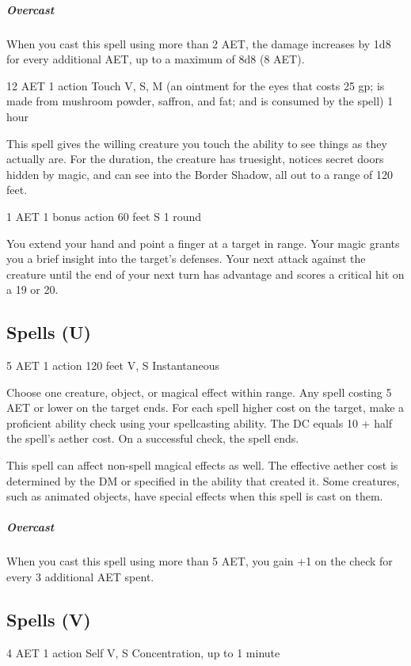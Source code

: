 \subparagraph*{Overcast} When you cast this spell using more than 2 AET, the damage increases by 1d8 for every additional AET, up to a maximum of 8d8 (8 AET).


{12 AET}
{1 action}
{Touch}
{V, S, M (an ointment for the eyes that costs 25 gp; is made from mushroom powder, saffron, and fat; and is consumed by the spell)}
{1 hour}

This spell gives the willing creature you touch the ability to see things as they actually are. For the duration, the creature has truesight, notices secret doors hidden by magic, and can see into the Border Shadow, all out to a range of 120 feet.


{1 AET}
{1 bonus action}
{60 feet}
{S}
{1 round}

You extend your hand and point a finger at a target in range. Your magic grants you a brief insight into the target's defenses. Your next attack against the creature until the end of your next turn has advantage and scores a critical hit on a 19 or 20. 

\subsection{Spells (U)}

{5 AET}
{1 action}
{120 feet}
{V, S}
{Instantaneous}

Choose one creature, object, or magical effect within range. Any spell costing 5 AET or lower on the target ends. For each spell higher cost on the target, make a proficient ability check using your spellcasting ability. The DC equals 10 + half the spell's aether cost. On a successful check, the spell ends.

This spell can affect non-spell magical effects as well. The effective aether cost is determined by the DM or specified in the ability that created it. Some creatures, such as animated objects, have special effects when this spell is cast on them.

\subparagraph*{Overcast} When you cast this spell using more than 5 AET, you gain +1 on the check for every 3 additional AET spent.

\subsection{Spells (V)}

{4 AET}
{1 action}
{Self}
{V, S}
{Concentration, up to 1 minute}

